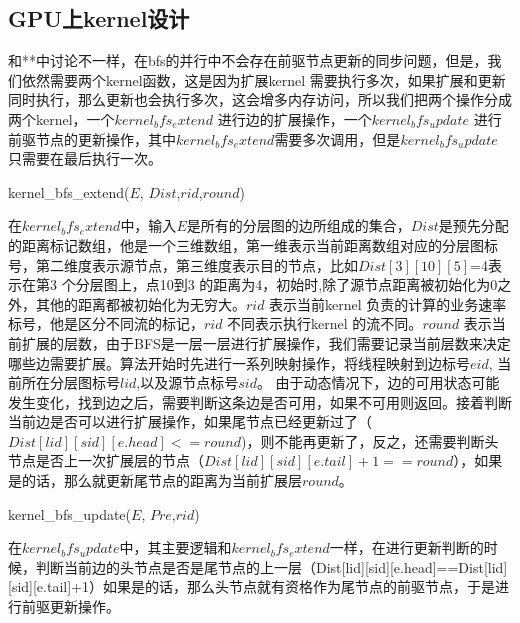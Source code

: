 \subsection{GPU上kernel设计}
  和**中讨论不一样，在bfs的并行中不会存在前驱节点更新的同步问题，但是，我们依然需要两个kernel函数，这是因为扩展kernel 需要执行多次，如果扩展和更新同时执行，那么更新也会执行多次，这会增多内存访问，所以我们把两个操作分成两个kernel，一个$kernel_bfs_extend$ 进行边的扩展操作，一个$kernel_bfs_update$ 进行前驱节点的更新操作，其中$kernel_bfs_extend$需要多次调用，但是$kernel_bfs_update$ 只需要在最后执行一次。
\begin{algorithm}[t]
\begin{algorithmic}[1]
\caption{\small{kernel\_bfs\_extend($E$, $Dist$,$rid$,$round$)}}
\label{KernelBFS}
\EndIf
{}
\EndIf
\Return
\end{algorithmic}
\end{algorithm}
 在$kernel_bfs_extend$中，输入$E$是所有的分层图的边所组成的集合，$Dist$是预先分配的距离标记数组，他是一个三维数组，第一维表示当前距离数组对应的分层图标号，第二维度表示源节点，第三维度表示目的节点，比如$Dist[3][10][5]$=4表示在第3 个分层图上，点10到3 的距离为4，初始时,除了源节点距离被初始化为0之外，其他的距离都被初始化为无穷大。$rid$ 表示当前kernel 负责的计算的业务速率标号，他是区分不同流的标记，$rid$ 不同表示执行kernel 的流不同。$round$ 表示当前扩展的层数，由于BFS是一层一层进行扩展操作，我们需要记录当前层数来决定哪些边需要扩展。算法开始时先进行一系列映射操作，将线程映射到边标号$eid$, 当前所在分层图标号$lid$,以及源节点标号$sid$。 由于动态情况下，边的可用状态可能发生变化，找到边之后，需要判断这条边是否可用，如果不可用则返回。接着判断当前边是否可以进行扩展操作，如果尾节点已经更新过了（$Dist[lid][sid][e.head]<=round$)，则不能再更新了，反之，还需要判断头节点是否上一次扩展层的节点（$Dist[lid][sid][e.tail]+1==round$），如果是的话，那么就更新尾节点的距离为当前扩展层$round$。
\begin{algorithm}[t]
\begin{algorithmic}[1]
\caption{\small{kernel\_bfs\_update($E$, $Pre$,$rid$)}}
\label{KernelBFS}
\EndIf
{}
\EndIf
\Return
\end{algorithmic}
\end{algorithm}
 在$kernel_bfs_update$中，其主要逻辑和$kernel_bfs_extend$一样，在进行更新判断的时候，判断当前边的头节点是否是尾节点的上一层（Dist[lid][sid][e.head]==Dist[lid][sid][e.tail]+1）如果是的话，那么头节点就有资格作为尾节点的前驱节点，于是进行前驱更新操作。
  
